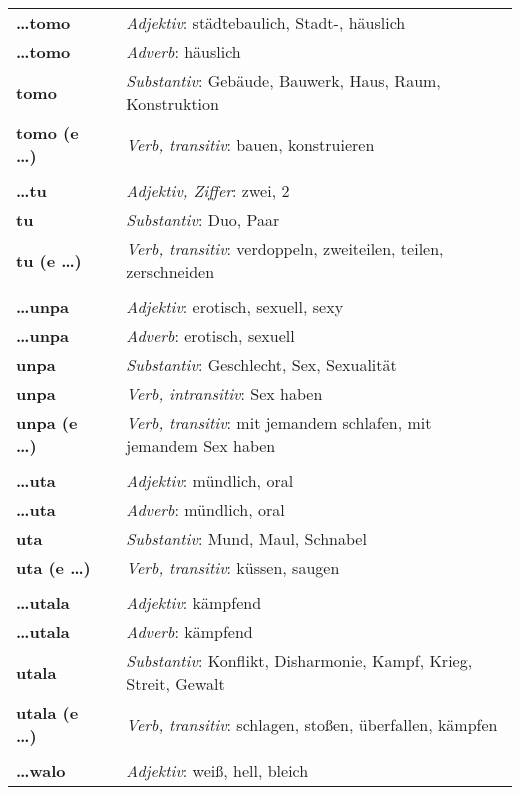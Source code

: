 \begin{supertabular}{p{2,5cm}|ll}
\textbf{\dots tomo} && \textit{Adjektiv}: städtebaulich, Stadt-, häuslich \\ 
\textbf{\dots tomo} && \textit{Adverb}: häuslich \\ 
\textbf{tomo} && \textit{Substantiv}: Gebäude, Bauwerk, Haus, Raum, Konstruktion \\ 
\textbf{tomo (e \dots)} && \textit{Verb, transitiv}: bauen, konstruieren \\ 
 && \\ %
\textbf{\dots tu} && \textit{Adjektiv, Ziffer}: zwei, 2 \\ 
\textbf{tu} && \textit{Substantiv}: Duo, Paar \\ 
\textbf{tu (e \dots)} && \textit{Verb, transitiv}: verdoppeln, zweiteilen, teilen, zerschneiden \\ 
 && \\ %
\textbf{\dots unpa} && \textit{Adjektiv}:  erotisch, sexuell, sexy \\ 
\textbf{\dots unpa} && \textit{Adverb}:  erotisch, sexuell \\ 
\textbf{unpa} && \textit{Substantiv}: Geschlecht, Sex, Sexualität \\ 
\textbf{unpa} && \textit{Verb, intransitiv}: Sex haben \\ 
\textbf{unpa (e \dots)} && \textit{Verb, transitiv}: mit jemandem schlafen, mit jemandem Sex haben \\ 
 && \\ %
\textbf{\dots uta} && \textit{Adjektiv}: mündlich, oral \\ 
\textbf{\dots uta} && \textit{Adverb}: mündlich, oral \\ 
\textbf{uta} && \textit{Substantiv}: Mund, Maul, Schnabel \\ 
\textbf{uta (e \dots)} && \textit{Verb, transitiv}: küssen, saugen \\ 
 && \\ %
\textbf{\dots utala} && \textit{Adjektiv}: kämpfend \\ 
\textbf{\dots utala} && \textit{Adverb}: kämpfend \\ 
\textbf{utala} && \textit{Substantiv}: Konflikt, Disharmonie, Kampf, Krieg, Streit, Gewalt \\ 
\textbf{utala (e \dots)} && \textit{Verb, transitiv}: schlagen, stoßen, überfallen, kämpfen \\ 
 && \\ %
\textbf{\dots walo} && \textit{Adjektiv}: weiß, hell, bleich \\ 

\end{supertabular}
